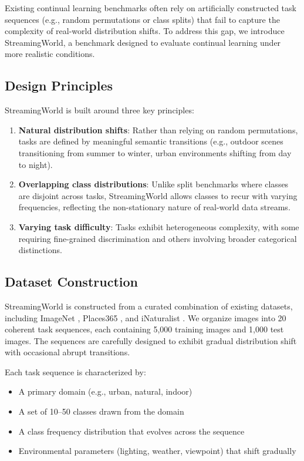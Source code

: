 \documentclass[11pt]{article}
\begin{document}
Existing continual learning benchmarks often rely on artificially constructed task sequences (e.g., random permutations or class splits) that fail to capture the complexity of real-world distribution shifts. To address this gap, we introduce StreamingWorld, a benchmark designed to evaluate continual learning under more realistic conditions.

\subsection{Design Principles}

StreamingWorld is built around three key principles:
\begin{enumerate}
    \item \textbf{Natural distribution shifts}: Rather than relying on random permutations, tasks are defined by meaningful semantic transitions (e.g., outdoor scenes transitioning from summer to winter, urban environments shifting from day to night).
    \item \textbf{Overlapping class distributions}: Unlike split benchmarks where classes are disjoint across tasks, StreamingWorld allows classes to recur with varying frequencies, reflecting the non-stationary nature of real-world data streams.
    \item \textbf{Varying task difficulty}: Tasks exhibit heterogeneous complexity, with some requiring fine-grained discrimination and others involving broader categorical distinctions.
\end{enumerate}

\subsection{Dataset Construction}

StreamingWorld is constructed from a curated combination of existing datasets, including ImageNet \citep{deng2009imagenet}, Places365 \citep{zhou2017places}, and iNaturalist \citep{van2018inaturalist}. We organize images into 20 coherent task sequences, each containing 5,000 training images and 1,000 test images. The sequences are carefully designed to exhibit gradual distribution shift with occasional abrupt transitions.

Each task sequence is characterized by:
\begin{itemize}
    \item A primary domain (e.g., urban, natural, indoor)
    \item A set of 10--50 classes drawn from the domain
    \item A class frequency distribution that evolves across the sequence
    \item Environmental parameters (lighting, weather, viewpoint) that shift gradually
\end{itemize}
\end{document}
